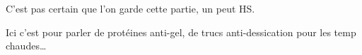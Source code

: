 \begin{note}

C'est pas certain que l'on garde cette partie, un peut HS.

Ici c’est pour parler de protéines anti-gel, de trucs anti-dessication pour les temp chaudes\ldots

\end{note} %